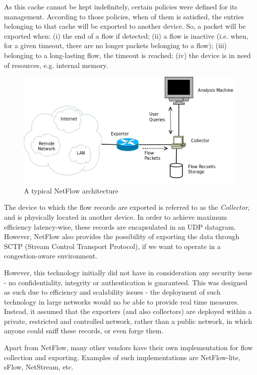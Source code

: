 \documentclass[runningheads,a4paper]{llncs}
\begin{document}
As this cache cannot be kept indefinitely, certain policies were defined for its management. According to those policies, when of them is satisfied, the entries belonging to that cache will be exported to another device. So, a packet will be exported when: (i) the end of a flow if detected; (ii) a flow is inactive (i.e. when, for a given timeout, there are no longer packets belonging to a flow); (iii) belonging to a long-lasting flow, the timeout is reached; (iv) the device is in need of resources, e.g. internal memory.   


\begin{figure}[htp]
\centering
\includegraphics[scale=0.70]{netflow_arch.png}
\caption{A typical NetFlow architecture}
\label{fig:nfarch}
\end{figure}


The device to which the flow records are exported is referred to as the \textit{Collector}, and is physically located in another device. In order to achieve maximum efficiency latency-wise, these records are encapsulated in an UDP datagram. However, NetFlow also provides the possibility of exporting the data through SCTP (Stream Control Transport Protocol), if we want to operate in a congestion-aware environment.


However, this technology initially did not have in consideration any security issue - no confidentiality, integrity or authentication is guaranteed. This was designed as such due to efficiency and scalability issues - the deployment of such technology in large networks would no be able to provide real time measures. Instead, it assumed that the exporters (and also collectors) are deployed within a private, restricted and controlled network, rather than a public network, in which anyone could sniff these records, or even forge them.


Apart from NetFlow, many other vendors have their own implementation for flow collection and exporting. Examples of such implementations are NetFlow-lite, sFlow, NetStream, etc.
\end{document}
